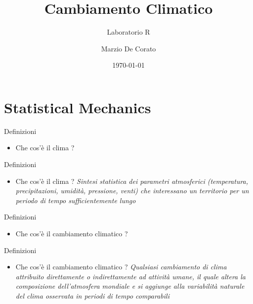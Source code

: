 \documentclass{beamer}
\title[Laboratorio R]{Cambiamento Climatico}
\subtitle{Laboratorio R}
\author{Marzio De Corato }
\date{\today}
\begin{document}
\begin{frame}
\vspace{+6.5 cm}  \titlepage
\end{frame}

\usebackgroundtemplate{ } 





\section{Statistical Mechanics}


\begin{frame}{Definizioni}
\begin{itemize}
\item Che cos'è il clima ? 
\end{itemize}
\end{frame}


\begin{frame}{Definizioni}
\begin{itemize}
\item Che cos'è il clima ? \textit{Sintesi statistica dei parametri atmosferici (temperatura, precipitazioni, umidità, pressione, venti) che interessano un
territorio per un periodo di tempo sufficientemente lungo} \cite{ispra}
\end{itemize}
\end{frame}


\begin{frame}{Definizioni}
\begin{itemize}
\item Che cos'è il cambiamento climatico ? 
\end{itemize}
\end{frame}

\begin{frame}{Definizioni}
\begin{itemize}
\item Che cos'è il cambiamento climatico ?  \textit{Qualsiasi cambiamento di clima attribuito direttamente o indirettamente ad attività umane, il quale altera la composizione dell'atmosfera mondiale e si aggiunge alla variabilità naturale del clima osservata in periodi di tempo comparabili} \cite{ispra}
\end{itemize}
\end{frame}
\end{document}
